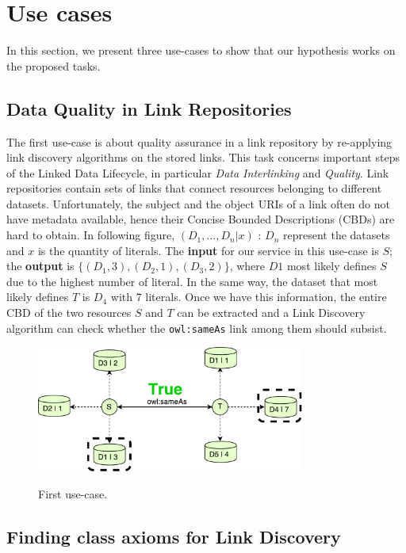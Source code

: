 \section{Use cases}

In this section, we present three use-cases to show that our hypothesis works on the proposed tasks.

\subsection{Data Quality in Link Repositories}

The first use-case is about quality assurance in a link repository by re-applying link discovery algorithms on the stored links.
This task concerns important steps of the Linked Data Lifecycle, in particular \textit{Data Interlinking} and \textit{Quality}.
Link repositories contain sets of links that connect resources belonging to different datasets. 
Unfortunately, the subject and the object URIs of a link often do not have metadata available, hence their Concise Bounded Descriptions (CBDs) are hard to obtain.
In following figure, $(D_1,...,D_n|x)$ : $D_n$ represent the datasets and $x$ is the quantity of literals. 
The \textbf{input} for our service in this use-case is $S$; the \textbf{output} is $\{(D_1,3),(D_2,1),(D_3,2)\}$, where $D1$ most likely defines $S$ due to the highest number of literal. 
In the same way, the dataset that most likely defines $T$ is $D_4$ with 7 literals. 
Once we have this information, the entire CBD of the two resources $S$ and $T$ can be extracted and a Link Discovery algorithm can check whether the \texttt{owl:sameAs} link among them should subsist.


\begin{figure}[htb] 
	\centering
	\includegraphics[width=250pt]{img/true.pdf}
	\label{fig:caseTrue}
	\caption{First use-case.}
\end{figure}

\subsection{Finding class axioms for Link Discovery}

